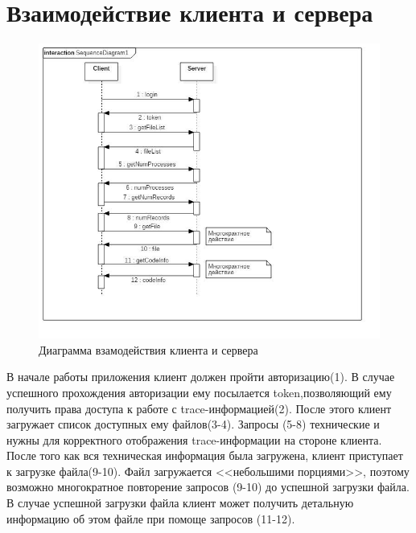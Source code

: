 \section{Взаимодействие клиента и сервера}
\begin{figure}[h!]
	\centering
	\includegraphics[width=1.1\textwidth]{img/clientServer.jpg}
	\caption{Диаграмма взамодействия клиента и сервера}
	\label{fig:spire12}
\end{figure}
В начале работы приложения клиент должен пройти авторизацию(1). В случае успешного прохождения авторизации ему посылается token,позволяющий ему получить права доступа к работе с trace-информацией(2). После этого клиент загружает список доступных ему файлов(3-4).
Запросы (5-8) технические и нужны для корректного отображения trace-информации на стороне клиента.  После того как вся техническая информация была загружена, клиент приступает к загрузке файла(9-10). Файл загружается <<небольшими порциями>>, поэтому возможно многократное повторение запросов (9-10) до успешной загрузки файла. В случае успешной загрузки файла клиент может получить детальную информацию об этом файле при помоще запросов (11-12).

